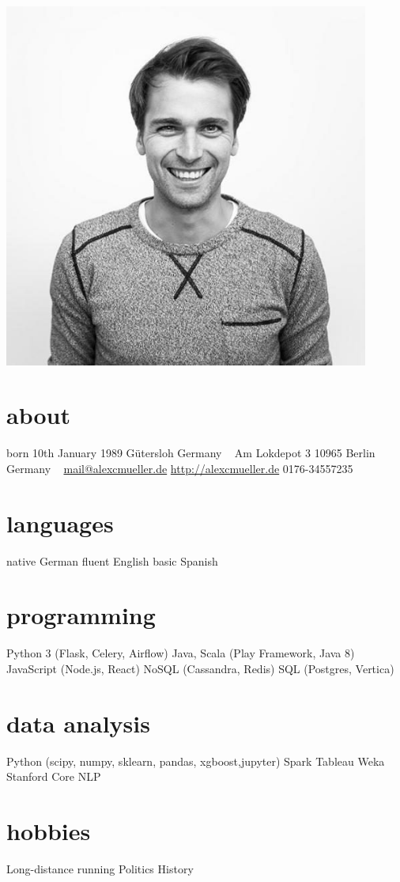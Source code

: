 \documentclass[a4paper]{friggeri-cv}
\begin{document}
       {}
\begin{aside}
 \includegraphics[width=0.9\textwidth]{alex-mueller.jpg} 
  \section{about}
  	born 10th January 1989
  	Gütersloh Germany
  	~
   	Am Lokdepot 3
    10965 Berlin
    Germany
    ~
    \href{mailto:mail@alexcmueller.de}{mail@alexcmueller.de}
    \href{http://alexcmueller.de}{http://alexcmueller.de}
    0176-34557235
  \section{languages}
    native German
    fluent English
    basic Spanish
  \section{programming}
    Python 3
    (Flask, Celery, Airflow)
    Java, Scala
    (Play Framework, Java 8)
    JavaScript
    (Node.js, React)
    NoSQL
    (Cassandra, Redis)
    SQL
    (Postgres, Vertica)
    \section{data analysis}
   	Python (scipy, numpy, sklearn, pandas, xgboost,jupyter)
   	Spark
    Tableau
   	Weka
   	Stanford Core NLP
    \section{hobbies}
    Long-distance running
    Politics
    History
\end{aside}
\end{document}
